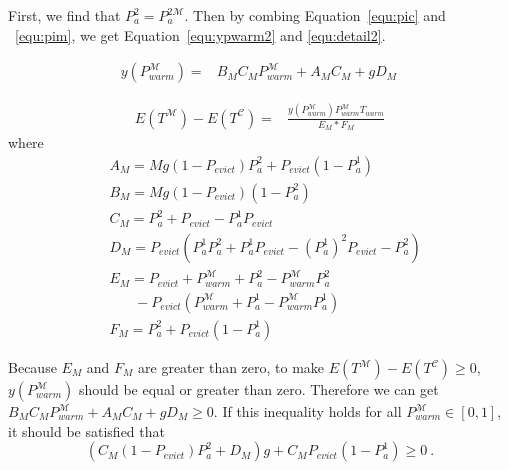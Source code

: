 First, we find that $P_{a}^{\mathfrak{2}} = P_{a}^{\mathfrak{2}\mathcal{M}}$.
Then by combing Equation~\ref{equ:pic} and ~\ref{equ:pim}, we get Equation~\ref{equ:ypwarm2} and \ref{equ:detail2}.


\begin{equation}
\label{equ:ypwarm2}
\begin{split}
y(P_{warm}^{\mathcal{M}}) = &B_{M}C_{M}P_{warm}^{\mathcal{M}}+A_{M}C_{M}+gD_{M} \,
\end{split}\end{equation}

\begin{equation}
\label{equ:detail2}
\begin{split}
E(T^{\mathcal{M}}) - E(T^{\mathcal{C}}) = &\frac{y(P_{warm}^{\mathcal{M}})P_{warm}^{\mathcal{M}}T_{warm}}{E_{M}*F_{M}}
\end{split}\end{equation}
where
\begin{equation*}
\begin{split}
&A_{M}= Mg(1-P_{evict})P_{a}^{\mathfrak{2}}+P_{evict}(1-P_{a}^{\mathfrak{1}})\\
&B_{M}=Mg(1-P_{evict})(1-P_{a}^{\mathfrak{2}})\\
&C_{M}=P_{a}^{\mathfrak{2}}+P_{evict}-P_{a}^{\mathfrak{1}}P_{evict}\\
&D_{M}=P_{evict}(P_{a}^{\mathfrak{1}}P_{a}^{\mathfrak{2}}+P_{a}^{\mathfrak{1}}P_{evict}-(P_{a}^{\mathfrak{1}})^2P_{evict}-P_{a}^{\mathfrak{2}})\\
&E_{M}=P_{evict}+P_{warm}^{\mathcal{M}}+P_{a}^{\mathfrak{2}}-P_{warm}^{\mathcal{M}}P_{a}^{\mathfrak{2}} \\& \ \ \ \ \ \ \ \ -P_{evict}(P_{warm}^{\mathcal{M}}+P_{a}^{\mathfrak{1}}-P_{warm}^{\mathcal{M}}P_{a}^{\mathfrak{1}})\\
&F_{M}=P_{a}^{\mathfrak{2}}+P_{evict}(1-P_{a}^{\mathfrak{1}})
\end{split}\end{equation*}

Because $E_{M}$ and $F_{M}$ are greater than zero, to make $E(T^{\mathcal{M}}) - E(T^{\mathcal{C}}) \geq 0$, $y(P_{warm}^{\mathcal{M}})$ should be equal or greater than zero.
Therefore we can get $ B_{M}C_{M}P_{warm}^{\mathcal{M}}+A_{M}C_{M}+gD_{M} \geq 0$.
If this inequality holds for all $P_{warm}^{\mathcal{M}} \in [0,1]$, it should be satisfied that
\begin{equation}\label{equ:omega}
  (C_{M}(1-P_{evict})P_{a}^{\mathfrak{2}}+D_{M})g+C_{M}P_{evict}(1-P_{a}^{\mathfrak{1}}) \geq 0 \ .
\end{equation}

